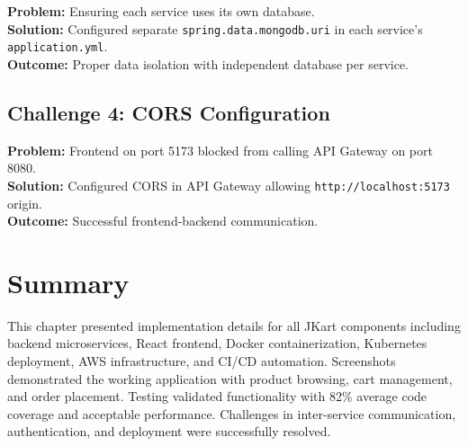 \textbf{Problem:} Ensuring each service uses its own database.\\
\textbf{Solution:} Configured separate \texttt{spring.data.mongodb.uri} in each service's \texttt{application.yml}.\\
\textbf{Outcome:} Proper data isolation with independent database per service.

\subsection{Challenge 4: CORS Configuration}

\textbf{Problem:} Frontend on port 5173 blocked from calling API Gateway on port 8080.\\
\textbf{Solution:} Configured CORS in API Gateway allowing \texttt{http://localhost:5173} origin.\\
\textbf{Outcome:} Successful frontend-backend communication.

\section{Summary}

This chapter presented implementation details for all JKart components including backend microservices, React frontend, Docker containerization, Kubernetes deployment, AWS infrastructure, and CI/CD automation. Screenshots demonstrated the working application with product browsing, cart management, and order placement. Testing validated functionality with 82\% average code coverage and acceptable performance. Challenges in inter-service communication, authentication, and deployment were successfully resolved.

